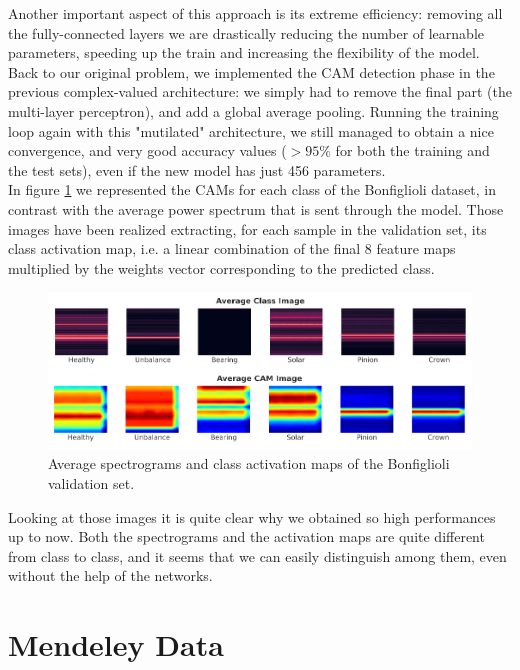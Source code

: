 \documentclass[../main.tex]{subfiles}
\begin{document}
Another important aspect of this approach is its extreme efficiency: removing all the fully-connected layers we are drastically reducing the number of learnable parameters, speeding up the train and increasing the flexibility of the model.\\
Back to our original problem, we implemented the CAM detection phase in the previous complex-valued architecture: we simply had to remove the final part (the multi-layer perceptron), and add a global average pooling. Running the training loop again with this "mutilated" architecture, we still managed to obtain a nice convergence, and very good accuracy values ($>95\%$ for both the training and the test sets), even if the new model has just 456 parameters.\\
In figure \ref{fig:bonfiglioli_CAM_images} we represented the CAMs for each class of the Bonfiglioli dataset, in contrast with the average power spectrum that is sent through the model. Those images have been realized extracting, for each sample in the validation set, its class activation map, i.e. a linear combination of the final 8 feature maps multiplied by the weights vector corresponding to the predicted class. 
\begin{figure}[ht]
	\centering
	\includegraphics[width=\textwidth]{pictures/bonfiglioli_CAM_images}
	\caption{Average spectrograms and class activation maps of the Bonfiglioli validation set.}
	\label{fig:bonfiglioli_CAM_images}	
\end{figure}

Looking at those images it is quite clear why we obtained so high performances up to now. Both the spectrograms and the activation maps are quite different from class to class, and it seems that we can easily distinguish among them, even without the help of the networks.

\section{Mendeley Data}
\label{sec:mendeley_analysis}
\end{document}
